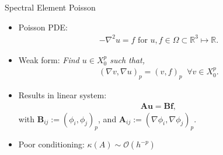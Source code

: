 \begin{frame}{Spectral Element Poisson}
  \begin{itemize}
  \item Poisson PDE:
  \begin{align*}
    -\nabla^2 u = f \text{ for } u,f \in \Omega \subset \mathbb R^3 \mapsto \mathbb R.
    \label{eqn:poisson}
  \end{align*}
  \item Weak form:
  {\em  Find $u \in X_0^p$ such that,}
  \begin{align*}
    (\nabla v, \nabla u)_p = (v,f)_p 
  \;\;
  \forall v \in X_0^p.
  \end{align*}
  \item Results in linear system:
  \begin{align*}
    \mathbf A \mathbf u = \mathbf B \mathbf f,
  \end{align*}
  with
  $\mathbf B_{ij} := (\phi_i,\phi_j)_p$, and 
  $\mathbf A_{ij} := (\nabla \phi_i, \nabla \phi_j)_p$.  

  \item Poor conditioning: $\kappa(A)\sim\mathcal O(h^{-p})$
  \end{itemize}
\end{frame}